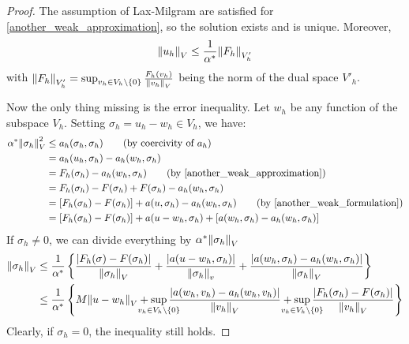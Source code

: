 \begin{proof}
    The assumption of Lax-Milgram are satisfied for \eqref{another_weak_approximation}, so the solution exists and is unique. Moreover,
    \[
        \norm{u_h}_V \leq \frac{1}{\alpha^*} \norm{F_h}_{V'_h} 
    \]
    with \(\norm{F_h}_{V'_h} = \sup_{v_h \in V_h \backslash \left\{0\right\}} \frac{F_h(v_h)}{\norm{v_h}_V}\) being the norm of the dual space \(V'_h\).

    Now the only thing missing is the error inequality. Let \(w_h\) be any function of the subspace \(V_h\). Setting \(\sigma_h = u_h -w_h \in V_h\), we have:
    \begin{align*}
        \alpha^* \norm{\sigma_h}^2_V &\leq a_h(\sigma_h, \sigma_h) \tag*{(by coercivity of \(a_h\))} \\
        &= a_h(u_h, \sigma_h) - a_h(w_h, \sigma_h) \\
        &= F_h(\sigma_h) - a_h(w_h, \sigma_h) \tag*{(by \eqref{another_weak_approximation})} \\
        &= F_h(\sigma_h) - F(\sigma_h) + F(\sigma_h) - a_h(w_h, \sigma_h) \\
        &= \left[F_h(\sigma_h)-F(\sigma_h)\right] + a(u, \sigma_h) - a_h(w_h, \sigma_h) \tag*{(by \eqref{another_weak_formulation})} \\
        &= \left[F_h(\sigma_h) - F(\sigma_h)\right] + a(u-w_h, \sigma_h) + \left[a(w_h, \sigma_h) - a_h(w_h, \sigma_h)\right]
    \end{align*}
    If \(\sigma_h \neq 0\), we can divide everything by \(\alpha^*\norm{\sigma_h}_V\)
    \begin{align*}
        \norm{\sigma_h}_V &\leq \frac{1}{\alpha^*} \left\{\frac{\abs{F_h(\sigma) - F(\sigma_h)}}{\norm{\sigma_h}_V} + \frac{\abs{a(u-w_h,\sigma_h)}}{\norm{\sigma_h}_v} + \frac{\abs{a(w_h, \sigma_h) - a_h(w_h, \sigma_h)}}{\norm{\sigma_h}_V}\right\} \\
        &\leq \frac{1}{\alpha^*} \left\{M\norm{u-w_h}_V + \sup_{\mathclap{v_h \in V_h \backslash \left\{0\right\}}} \frac{\abs{a(w_h, v_h) - a_h(w_h, v_h)}}{\norm{v_h}_V} + \sup_{\mathclap{v_h \in V_h \backslash \left\{0\right\}}}\frac{\abs{F_h(\sigma_h)-F(\sigma_h)}}{\norm{v_h}_V}\right\}
    \end{align*}
    Clearly, if \(\sigma_h = 0\), the inequality still holds.


\end{proof}
